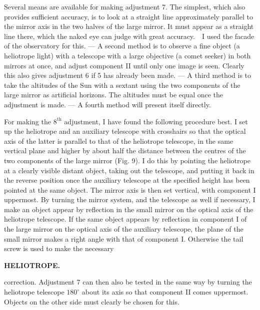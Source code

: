 \par\noindent\hspace*{\parindent}Several means are available for making adjustment 7. The simplest, which also provides sufficient accuracy, is to look at a straight line approximately parallel to the mirror axis in the two halves of the large mirror. It must appear as a straight line there, which the naked eye can judge with great accuracy.\ \ I used the facade of the observatory for this. --- A second method is to observe a fine object (a heliotrope light) with a telescope with a large objective (a comet seeker) in both mirrors at once, and adjust component II until only one image is seen. Clearly this also gives adjustment 6 if 5 has already been made. --- A third method is to take the altitudes of the Sun with a sextant using the two components of the large mirror as artificial horizons. The altitudes must be equal once the adjustment is made. --- A fourth method will present itself directly.

\par\noindent\hspace*{\parindent}For making the $8^{\mathrm{th}}$ adjustment, I have found the following procedure best. I set up the heliotrope and an auxiliary telescope with crosshairs so that the optical axis of the latter is parallel to that of the heliotrope telescope, in the same vertical plane and higher by about half the distance between the centres of the two components of the large mirror (Fig. 9). I do this by pointing the heliotrope at a clearly visible distant object, taking out the telescope, and putting it back in the reverse position once the auxiliary telescope at the specified height has been pointed at the same object. The mirror axis is then set vertical, with component I uppermost. By turning the mirror system, and the telescope as well if necessary, I make an object appear by reflection in the small mirror on the optical axis of the heliotrope telescope. If the same object appears by reflection in component I of the large mirror on the optical axis of the auxiliary telescope, the plane of the small mirror makes a right angle with that of component I. Otherwise the tail screw is used to make the necessary

\par\clearpage
\noindent\null\hfill{\small\textbf{HELIOTROPE.}}\hfill{}\par\medskip
\noindent correction. Adjustment 7 can then also be tested in the same way by turning the heliotrope telescope $180^\circ$ about its axis so that component II comes uppermost. Objects on the other side must clearly be chosen for this.


